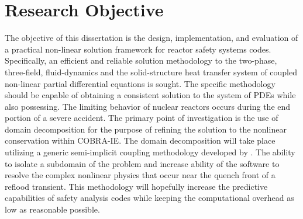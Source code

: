 \section{Research Objective}
The objective of this dissertation is the design, implementation, and evaluation of a practical non-linear solution framework for reactor safety systems codes.
Specifically, an efficient and reliable solution methodology to the two-phase, three-field, fluid-dynamics and the solid-structure heat transfer system of coupled non-linear partial differential equations is sought.
The specific methodology should be capable of obtaining a consistent solution to the system of PDEs while also possessing. \cite{Aktas1996}
The limiting behavior of nuclear reactors occurs during the end portion of a severe accident.
The primary point of investigation is the use of domain decomposition for the purpose of refining the solution to the nonlinear conservation within COBRA-IE.
The domain decomposition will take place utilizing a generic semi-implicit coupling methodology developed by \citet{Weaver2002}.
The ability to isolate a subdomain of the problem and increase ability of the software to resolve the complex nonlinear physics that occur near the quench front of a reflood transient.
This methodology will hopefully increase the predictive capabilities of safety analysis codes while keeping the computational overhead as low as reasonable possible.